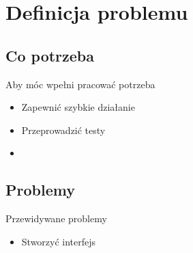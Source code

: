 \chapter{Definicja problemu}
\label{cha:Definicja problemu}

\section{Co potrzeba}
\label{sec:Co potrzeba}

Aby móc wpełni pracować potrzeba

\begin{itemize}
\item
Zapewnić szybkie działanie
\item
Przeprowadzić testy
\item

\end{itemize}


\section{Problemy}
\label{sec:Problemy}

Przewidywane problemy

\begin{itemize}
\item
Stworzyć interfejs

\end{itemize}


